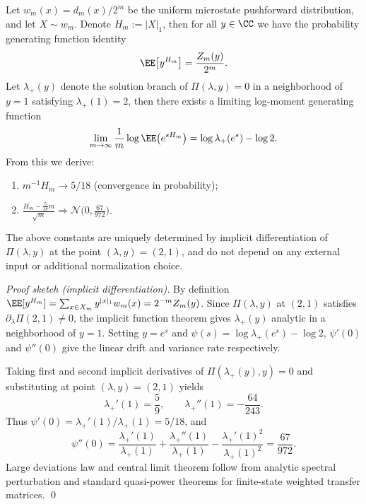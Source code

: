 \begin{conclusion}\label{con:xi-terminal-zm-lln-clt}
Let \(w_m(x)=d_m(x)/2^m\) be the uniform microstate pushforward distribution, and let \(X\sim w_m\).
Denote \(H_m:=|X|_1\), then for all \(y\in\CC\) we have the probability generating function identity
\[
\EE\!\left[y^{H_m}\right]=\frac{Z_m(y)}{2^m}.
\]
Let \(\lambda_+(y)\) denote the solution branch of \(\Pi(\lambda,y)=0\) in a neighborhood of \(y=1\) satisfying \(\lambda_+(1)=2\), then there exists a limiting log-moment generating function
\[
\lim_{m\to\infty}\frac{1}{m}\log \EE\!\left(e^{sH_m}\right)
=\log\lambda_+(e^s)-\log 2.
\]
From this we derive:
\begin{enumerate}
  \item \(m^{-1}H_m\to 5/18\) (convergence in probability);
  \item \(\frac{H_m-\frac{5}{18}m}{\sqrt{m}}\Rightarrow \mathcal N\!\bigl(0,\frac{67}{972}\bigr)\).
\end{enumerate}
The above constants are uniquely determined by implicit differentiation of \(\Pi(\lambda,y)\) at the point \((\lambda,y)=(2,1)\), and do not depend on any external input or additional normalization choice.
\end{conclusion}
\begin{proof}[Proof sketch (implicit differentiation)]
By definition
\(
\EE[y^{H_m}]
=\sum_{x\in X_m}y^{|x|_1}w_m(x)
=2^{-m}Z_m(y)
\).
Since \(\Pi(\lambda,y)\) at \((2,1)\) satisfies \(\partial_\lambda\Pi(2,1)\neq 0\),
the implicit function theorem gives \(\lambda_+(y)\) analytic in a neighborhood of \(y=1\).
Setting \(y=e^s\) and \(\psi(s)=\log\lambda_+(e^s)-\log 2\), \(\psi'(0)\) and \(\psi''(0)\) give the linear drift and variance rate respectively.
\par
Taking first and second implicit derivatives of \(\Pi(\lambda_+(y),y)=0\) and substituting at point \((\lambda,y)=(2,1)\) yields
\[
\lambda_+'(1)=\frac{5}{9},
\qquad
\lambda_+''(1)=-\frac{64}{243}.
\]
Thus
\(
\psi'(0)=\lambda_+'(1)/\lambda_+(1)=5/18
\), and
\[
\psi''(0)=\frac{\lambda_+'(1)}{\lambda_+(1)}+\frac{\lambda_+''(1)}{\lambda_+(1)}-\frac{\lambda_+'(1)^2}{\lambda_+(1)^2}
=\frac{67}{972}.
\]
Large deviations law and central limit theorem follow from analytic spectral perturbation and standard quasi-power theorems for finite-state weighted transfer matrices. \qed
\end{proof}

